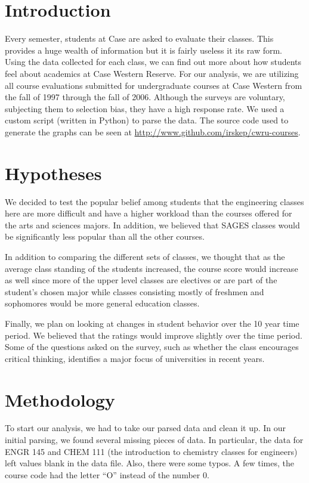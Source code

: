 \documentclass[12pt]{article}
\begin{document}
\maketitle

\section{Introduction}
Every semester, students at Case are asked to evaluate their classes. This provides a huge wealth of information but it is fairly useless it its raw form. Using the data collected for each class, we can find out more about how students feel about academics at Case Western Reserve. For our analysis, we are utilizing all course evaluations submitted for undergraduate courses at Case Western from the fall of 1997 through the fall of 2006. Although the surveys are voluntary, subjecting them to selection bias, they have a high response rate. We used a custom script (written in Python) to parse the data. The source code used to generate the graphs can be seen at \url{http://www.github.com/irskep/cwru-courses}.

\section{Hypotheses}
We decided to test the popular belief among students that the engineering classes here are more difficult and have a higher workload than the courses offered for the arts and sciences majors. In addition, we believed that SAGES classes would be significantly less popular than all the other courses.

In addition to comparing the different sets of classes, we thought that as the average class standing of the students increased, the course score would increase as well since more of the upper level classes are electives or are part of the student's chosen major while classes consisting mostly of freshmen and sophomores would be more general education classes.

Finally, we plan on looking at changes in student behavior over the 10 year time period. We believed that the ratings would improve slightly over the time period. Some of the questions asked on the survey, such as whether the class encourages critical thinking, identifies a major focus of universities in recent years.

\section{Methodology}
To start our analysis, we had to take our parsed data and clean it up. In our initial parsing, we found several missing pieces of data. In particular, the data for ENGR 145 and CHEM 111 (the introduction to chemistry classes for engineers) left values blank in the data file. Also, there were some typos. A few times, the course code had the letter ``O'' instead of the number 0.
\end{document}
